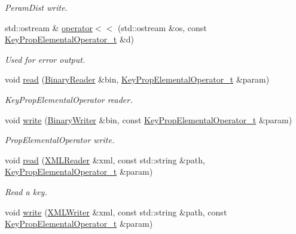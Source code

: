 \begin{DoxyCompactItemize}
\begin{DoxyCompactList}\small\item\em Peram\+Dist write. \end{DoxyCompactList}\item 
std\+::ostream \& \mbox{\hyperlink{namespaceHadron_a8fafc13cc7955fdf6c70c8c72c7b0000}{operator$<$$<$}} (std\+::ostream \&os, const \mbox{\hyperlink{structHadron_1_1KeyPropElementalOperator__t}{Key\+Prop\+Elemental\+Operator\+\_\+t}} \&d)
\begin{DoxyCompactList}\small\item\em Used for error output. \end{DoxyCompactList}\item 
void \mbox{\hyperlink{namespaceHadron_ac7fbe05fdb59de181eed9428364667e3}{read}} (\mbox{\hyperlink{classADATIO_1_1BinaryReader}{Binary\+Reader}} \&bin, \mbox{\hyperlink{structHadron_1_1KeyPropElementalOperator__t}{Key\+Prop\+Elemental\+Operator\+\_\+t}} \&param)
\begin{DoxyCompactList}\small\item\em Key\+Prop\+Elemental\+Operator reader. \end{DoxyCompactList}\item 
void \mbox{\hyperlink{namespaceHadron_a2d77dd144d88ef6a060cca397fb32373}{write}} (\mbox{\hyperlink{classADATIO_1_1BinaryWriter}{Binary\+Writer}} \&bin, const \mbox{\hyperlink{structHadron_1_1KeyPropElementalOperator__t}{Key\+Prop\+Elemental\+Operator\+\_\+t}} \&param)
\begin{DoxyCompactList}\small\item\em Prop\+Elemental\+Operator write. \end{DoxyCompactList}\item 
void \mbox{\hyperlink{namespaceHadron_a3b1642acb606c69519cf7dd88a01fbfd}{read}} (\mbox{\hyperlink{classADATXML_1_1XMLReader}{X\+M\+L\+Reader}} \&xml, const std\+::string \&path, \mbox{\hyperlink{structHadron_1_1KeyPropElementalOperator__t}{Key\+Prop\+Elemental\+Operator\+\_\+t}} \&param)
\begin{DoxyCompactList}\small\item\em Read a key. \end{DoxyCompactList}\item 
void \mbox{\hyperlink{namespaceHadron_a97758f7d26a76e70e4c61d4409eff7a6}{write}} (\mbox{\hyperlink{classADATXML_1_1XMLWriter}{X\+M\+L\+Writer}} \&xml, const std\+::string \&path, const \mbox{\hyperlink{structHadron_1_1KeyPropElementalOperator__t}{Key\+Prop\+Elemental\+Operator\+\_\+t}} \&param)

\end{DoxyCompactItemize}
